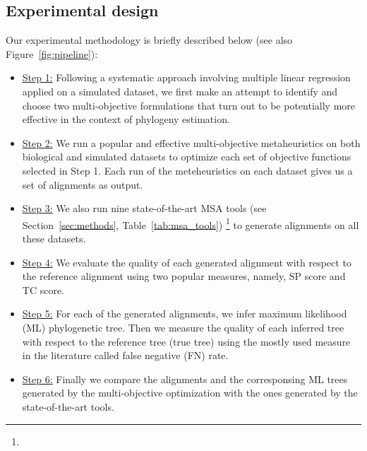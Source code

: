 \subsection{Experimental design}
Our experimental methodology is briefly described below (see also Figure~\ref{fig:pipeline}):
\begin{itemize}
	\item \underline{Step 1:} Following a systematic approach involving multiple linear regression applied on a simulated dataset, we first make an attempt to identify and choose two multi-objective formulations that turn out to be potentially more effective in the context of phylogeny estimation. 
	\item \underline{Step 2:} We run a popular and effective multi-objective metaheuristics on both biological and simulated datasets to optimize each set of objective functions selected in Step 1. Each run of the meteheuristics on each dataset gives us a set of alignments as output. 
	\item \underline{Step 3:} We also run nine state-of-the-art MSA tools (see Section~\ref{sec:methods}, Table~\ref{tab:msa_tools}) \footnote{} to generate alignments on all these datasets.
	\item \underline{Step 4:} We evaluate the quality of each generated alignment with respect to the reference alignment using two popular measures, namely, SP score and TC score. 
	\item \underline{Step 5:} For each of the generated alignments, we infer maximum likelihood (ML) phylogenetic tree. Then we measure the quality of each inferred tree with respect to the reference tree (true tree) using the mostly used measure in the literature called false negative (FN) rate.
	\item \underline{Step 6:} Finally we compare the alignments and the corresponsing ML trees generated by the multi-objective optimization with the ones generated by the state-of-the-art tools. %
\end{itemize}


